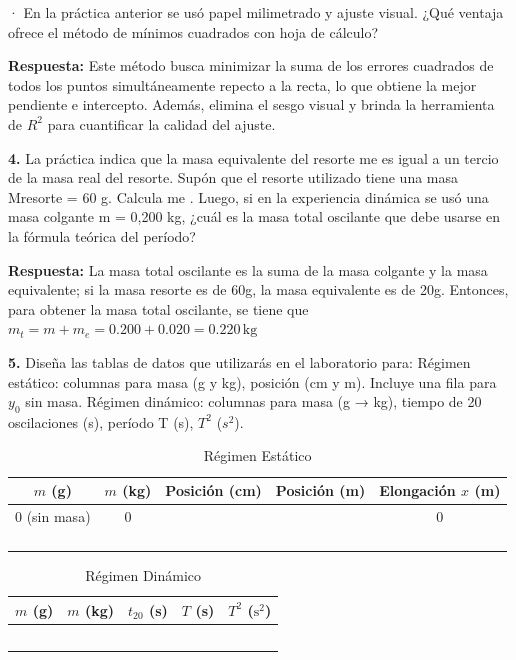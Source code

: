  · En la práctica anterior se usó papel milimetrado y ajuste visual. ¿Qué ventaja ofrece el
método de mínimos cuadrados con hoja de cálculo?

\textbf{Respuesta:} Este método busca minimizar la suma de los errores 
cuadrados de todos los puntos simultáneamente repecto a la recta, lo que 
obtiene la mejor pendiente e intercepto. Además, elimina el sesgo visual 
y brinda la herramienta de $R^ 2$ para cuantificar la calidad del ajuste.

\textbf{4.} La práctica indica que la masa equivalente del resorte me es igual a un tercio de la
masa real del resorte.
Supón que el resorte utilizado tiene una masa Mresorte = 60 g. Calcula me . Luego, si
en la experiencia dinámica se usó una masa colgante m = 0,200 kg, ¿cuál es la masa
total oscilante que debe usarse en la fórmula teórica del período?

\textbf{Respuesta:} La masa total oscilante es la suma de la masa colgante 
y la masa equivalente; si la masa resorte es de 60g,
 la masa equivalente es de 20g.
 Entonces, para obtener 
la masa total oscilante, se tiene que 
  $m_t = m + m_e = 0.200 + 0.020 = 0.220 \, \text{kg}$

 \textbf{5.} Diseña las tablas de datos que utilizarás en el laboratorio para:
Régimen estático: columnas para masa (g y kg), posición (cm y m).
 Incluye una fila
para $y_0$ sin masa.
Régimen dinámico: columnas para masa (g → kg), 
tiempo de 20 oscilaciones (s),
período T (s), $T ^2$ ($s^2$).

\begin{table}[h]
\centering
\caption{Régimen Estático}
\begin{tabular}{ccccc}
\toprule
$m$ (g) & $m$ (kg) & Posición (cm) & Posición (m) & Elongación $x$ (m) \\
\midrule
0 (sin masa) & 0 & & & 0 \\
& & & & \\
& & & & \\
& & & & \\
& & & & \\
\bottomrule
\end{tabular}
\label{tab:estatico}
\end{table}

\begin{table}[h]
\centering
\caption{Régimen Dinámico}
\begin{tabular}{ccccc}
\toprule
$m$ (g) & $m$ (kg) & $t_{20}$ (s) & $T$ (s) & $T^2$ ($\text{s}^2$) \\
\midrule
& & & & \\
& & & & \\
& & & & \\
& & & & \\
& & & & \\
\bottomrule
\end{tabular}
\label{tab:dinamico}
\end{table}